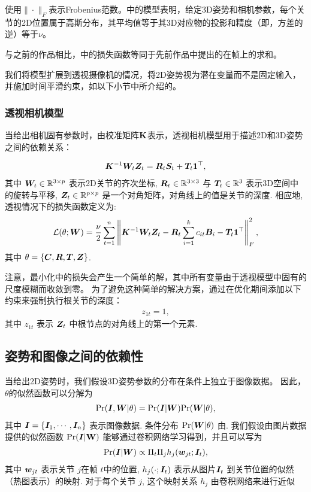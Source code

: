 使用$\|\cdot\|_F$表示Frobenius范数。中的模型表明，给定3D姿势和相机参数，每个关节的2D位置属于高斯分布，其平均值等于其3D对应物的投影和精度（即，方差的逆）等于$\nu$。

与之前的作品相比\cite{zhou2015sparse}，中的损失函数等同于先前作品中提出的\cite{zhou2015sparse}在帧上的求和。

我们将模型扩展到透视摄像机的情况，将2D姿势视为潜在变量而不是固定输入，并施加时间平滑约束，如以下小节中所介绍的。

\subsubsection{透视相机模型}

当给出相机固有参数时，由校准矩阵$\bf K$表示，透视相机模型用于描述2D和3D姿势之间的依赖关系：

\begin{align}\label{eq:model-fp}
    {\bm{K}}^{-1}{\bm{W}}_t{\bm{Z}}_t = {\bm{R}}_t{\bm{S}}_t + {\bm{T}}_t{\bm{1}}^\top,
\end{align}
其中 ${\bm{W}}_t\in\mathbb{R}^{3 \times p}$ 表示2D关节的齐次坐标, ${\bm{R}}_t\in\mathbb{R}^{3 \times 3}$ 与 ${\bm{T}}_t\in\mathbb{R}^{3}$ 表示3D空间中的旋转与平移, ${\bm{Z}}_t\in\mathbb{R}^{p \times p}$ 是一个对角矩阵，对角线上的值是关节的深度. 相应地, 透视情况下的损失函数定义为:
\begin{align}\label{eq:loss-fp}\small
\mathcal{L}(\theta;{\bm{W}}) = \frac{\nu}{2}\sum_{t=1}^{n}\left\|{\bm{K}}^{-1}{\bm{W}}_t{\bm{Z}}_t - {\bm{R}}_t\sum_{i=1}^{k} c_{it}{\bm{B}}_i - {\bm{T}}_t{\bm{1}}^\top\right\|_F^2,
\end{align}
其中 $\theta=\{{\bm{C}},{\bm{R}},{\bm{T}},{\bm{Z}}\}$.

注意，最小化中的损失会产生一个简单的解，其中所有变量由于透视模型中固有的尺度模糊而收敛到零。 为了避免这种简单的解决方案，通过在优化期间添加以下约束来强制执行根关节的深度：
\begin{align}
z_{1t}=1,
\end{align}
其中 $z_{1t}$ 表示 ${\bm{Z}}_t$ 中根节点的对角线上的第一个元素.

\subsection{姿势和图像之间的依赖性}

当给出2D姿势时，我们假设3D姿势参数的分布在条件上独立于图像数据。 因此，$\theta$的似然函数可以分解为
\begin{align}\label{eq:likelihood-complete}
\mbox{Pr}({\bm{I}},{\bm{W}}|\theta) = \mbox{Pr}({\bm{I}}|{\bm{W}})\mbox{Pr}({\bm{W}}|\theta),
\end{align}
其中 ${\bm{I}}=\{{\bm{I}}_1,\cdots,{\bm{I}}_n\}$ 表示图像数据. 条件分布 $\mbox{Pr}({\bm{W}}|\theta)$ 由. 我们假设由图片数据提供的似然函数 $\mbox{Pr}({\bm{I}}|\bf W)$ 能够通过卷积网络学习得到，并且可以写为
\begin{align}\label{eq:pr-I-W}
\mbox{Pr}({\bm{I}}|{\bm{W}}) \propto \Pi_{t}\Pi_{j}h_j({\bm{w}}_{jt};{\bm{I}}_t),
\end{align}
其中 ${\bm{w}}_{jt}$ 表示关节 $j$在帧 $t$中的位置, $h_j(\cdot;{\bm{I}}_t)$ 表示从图片${\bm{I}}_t$ 到关节位置的似然（热图表示）的映射.
对于每个关节 $j$, 这个映射关系 $h_j$ 由卷积网络来进行近似 

